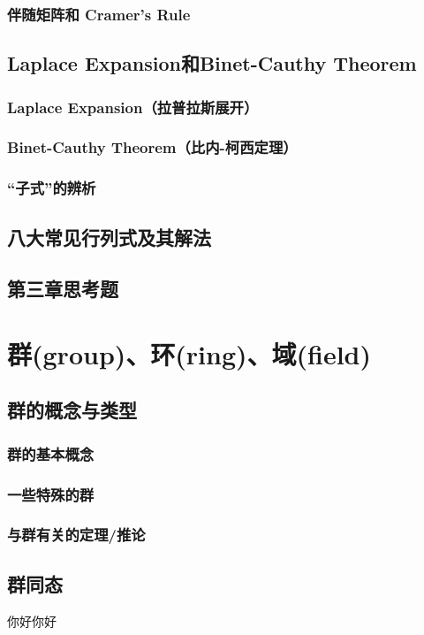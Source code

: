 \documentclass[zihao=-4,UTF8]{report}
\begin{document}
\subsection{伴随矩阵和 Cramer's Rule}
            
\section{Laplace Expansion和Binet-Cauthy Theorem}
\subsection{Laplace Expansion（拉普拉斯展开）}
\subsection{Binet-Cauthy Theorem（比内-柯西定理）}
\subsection{“子式”的辨析}

\section{八大常见行列式及其解法}

\section{第三章思考题}

\chapter{群(group)、环(ring)、域(field)}
\thispagestyle{fancy} 
\section{群的概念与类型}
\subsection{群的基本概念}
\subsection{一些特殊的群}
\subsection{与群有关的定理/推论}

\section{群同态}
你好你好
\end{document}
